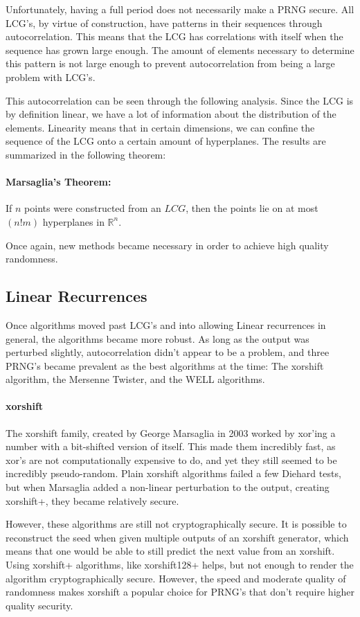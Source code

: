 \documentclass[11pt]{article}
\begin{document}
Unfortunately, having a full period does not necessarily make a PRNG secure. All LCG's, by virtue of construction, have patterns in their sequences through autocorrelation. This means that the LCG has correlations with itself when the sequence has grown large enough. The amount of elements necessary to determine this pattern is not large enough to prevent autocorrelation from being a large problem with LCG's. 

This autocorrelation can be seen through the following analysis. Since the LCG is by definition linear, we have a lot of information about the distribution of the elements. Linearity means that in certain dimensions, we can confine the sequence of the LCG onto a certain amount of hyperplanes. The results are summarized in the following theorem:

\paragraph{Marsaglia's Theorem: \cite{Marsaglia}}
If $n$ points were constructed from an $LCG$, then the points lie on at most $(n!m)$ hyperplanes in $\mathbb{R}^n.$

Once again, new methods became necessary in order to achieve high quality randomness. 
\subsection{Linear Recurrences}
Once algorithms moved past LCG's and into allowing Linear recurrences in general, the algorithms became more robust. As long as the output was perturbed slightly, autocorrelation didn't appear to be a problem, and three PRNG's became prevalent as the best algorithms at the time: The xorshift algorithm, the Mersenne Twister, and the WELL algorithms. 
\paragraph{xorshift} 
The xorshift family, created by George Marsaglia in 2003 worked by xor'ing a number with a bit-shifted version of itself. This made them incredibly fast, as xor's are not computationally expensive to do, and yet they still seemed to be incredibly pseudo-random. Plain xorshift algorithms failed a few Diehard tests, but when Marsaglia added a non-linear perturbation to the output, creating xorshift+, they became relatively secure. 

However, these algorithms are still not cryptographically secure. It is possible to reconstruct the seed when given multiple outputs of an xorshift generator, which means that one would be able to still predict the next value from an xorshift. Using xorshift+ algorithms, like xorshift128+ helps, but not enough to render the algorithm cryptographically secure. However, the speed and moderate quality of randomness makes xorshift a popular choice for PRNG's that don't require higher quality security. 
\end{document}
